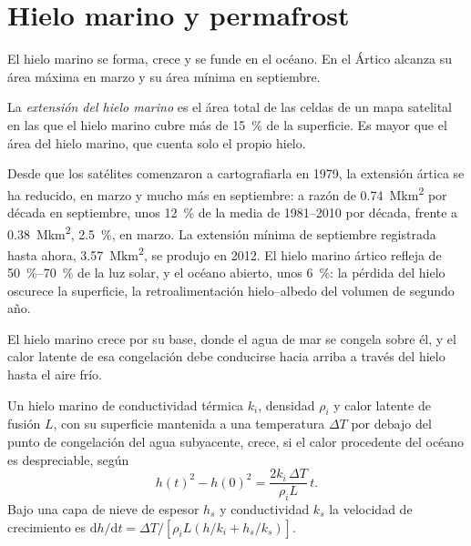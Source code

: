 \section{Hielo marino y permafrost}\label{sec:b3:glaciology:sea-ice}

El hielo marino se forma, crece y se funde en el océano. En el Ártico alcanza su
área máxima en marzo y su área mínima en septiembre.

\begin{definition}\label{def:b3:glaciology:sea-ice}
La \emph{extensión del hielo marino} es el área total de las
celdas de un mapa satelital en las que el hielo marino cubre más de
\qty{15}{\percent} de la superficie. Es mayor que el área del hielo marino,
que cuenta solo el propio hielo.
\end{definition}

Desde que los satélites comenzaron a cartografiarla en 1979, la extensión ártica se ha reducido,
en marzo y mucho más en septiembre: a razón de \qty{0.74}{\mega km^2} por década en
septiembre, unos \qty{12}{\percent} de la media de 1981--2010 por década, frente a
\qty{0.38}{\mega km^2}, \qty{2.5}{\percent}, en marzo. La extensión mínima
de septiembre registrada hasta ahora, \qty{3.57}{\mega km^2}, se produjo en 2012. El hielo marino
ártico refleja de \qtyrange{50}{70}{\percent} de la luz solar, y el océano abierto,
unos \qty{6}{\percent}: la pérdida del hielo oscurece la superficie, la
retroalimentación hielo--albedo del volumen de segundo año.

El hielo marino crece por su base, donde el agua de mar se congela sobre él, y el calor latente
de esa congelación debe conducirse hacia arriba a través del hielo hasta el aire frío.

\begin{theorem}\label{thm:b3:glaciology:stefan}
Un hielo marino de conductividad térmica $k_i$, densidad $\rho_i$ y calor latente de
fusión $L$, con su superficie mantenida a una temperatura $\Delta T$ por debajo del
punto de congelación del agua subyacente, crece, si el calor procedente del océano es
despreciable, según
\[
h(t)^2 - h(0)^2 = \frac{2k_i\,\Delta T}{\rho_iL}\,t .
\]
Bajo una capa de nieve de espesor $h_s$ y conductividad $k_s$ la velocidad de crecimiento
es $\mathrm dh/\mathrm dt = \Delta T/[\rho_iL(h/k_i + h_s/k_s)]$.
\end{theorem}

